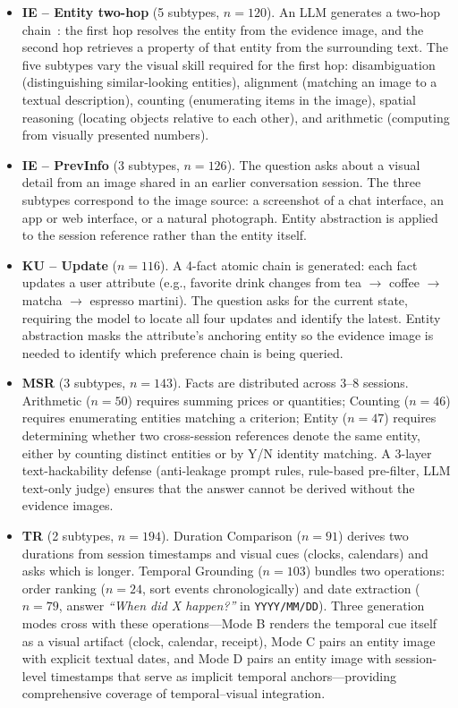 \documentclass{llmxive}
\begin{document}
\begin{itemize}
    \item \textbf{IE -- Entity two-hop} (5 subtypes, $n=120$). An LLM generates a two-hop chain~\cite{chang2022webqa}: the first hop resolves the entity from the evidence image, and the second hop retrieves a property of that entity from the surrounding text. The five subtypes vary the visual skill required for the first hop: disambiguation (distinguishing similar-looking entities), alignment (matching an image to a textual description), counting (enumerating items in the image), spatial reasoning (locating objects relative to each other), and arithmetic (computing from visually presented numbers).

    \item \textbf{IE -- PrevInfo} (3 subtypes, $n=126$). The question asks about a visual detail from an image shared in an earlier conversation session. The three subtypes correspond to the image source: a screenshot of a chat interface, an app or web interface, or a natural photograph. Entity abstraction is applied to the session reference rather than the entity itself.

    \item \textbf{KU -- Update} ($n=116$). A 4-fact atomic chain is generated: each fact updates a user attribute (e.g., favorite drink changes from tea $\to$ coffee $\to$ matcha $\to$ espresso martini). The question asks for the current state, requiring the model to locate all four updates and identify the latest. Entity abstraction masks the attribute's anchoring entity so the evidence image is needed to identify which preference chain is being queried.

    \item \textbf{MSR} (3 subtypes, $n=143$). Facts are distributed across 3--8 sessions. Arithmetic ($n=50$) requires summing prices or quantities; Counting ($n=46$) requires enumerating entities matching a criterion; Entity ($n=47$) requires determining whether two cross-session references denote the same entity, either by counting distinct entities or by Y/N identity matching. A 3-layer text-hackability defense (anti-leakage prompt rules, rule-based pre-filter, LLM text-only judge) ensures that the answer cannot be derived without the evidence images.

    \item \textbf{TR} (2 subtypes, $n=194$). Duration Comparison ($n=91$) derives two durations from session timestamps and visual cues (clocks, calendars) and asks which is longer. Temporal Grounding ($n=103$) bundles two operations: order ranking ($n=24$, sort events chronologically) and date extraction ($n=79$, answer \emph{``When did X happen?''} in \texttt{YYYY/MM/DD}). Three generation modes cross with these operations---Mode B renders the temporal cue itself as a visual artifact (clock, calendar, receipt), Mode C pairs an entity image with explicit textual dates, and Mode D pairs an entity image with session-level timestamps that serve as implicit temporal anchors---providing comprehensive coverage of temporal--visual integration.
\end{itemize}
\end{document}
